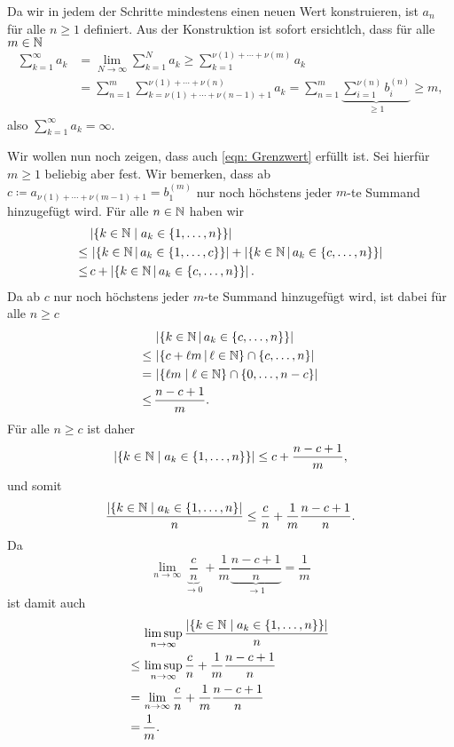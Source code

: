 \documentclass[a4paper,10pt]{article}
\begin{document}
Da wir in jedem der Schritte mindestens einen neuen Wert konstruieren, ist $a_n$ für alle $n \geq 1$ definiert. Aus der Konstruktion ist sofort ersichtlch, dass für alle $m \in \mathbb{N}$
\begin{align*}
 \sum_{k=1}^\infty a_k
 &= \lim_{N \to \infty} \sum_{k=1}^N a_k
 \geq \sum_{k=1}^{\nu(1)+\dotsb+\nu(m)} a_k \\
 &= \sum_{n=1}^m \sum_{k=\nu(1)+\dotsb+\nu(n-1)+1}^{\nu(1)+\dotsb+\nu(n)} a_k
 = \sum_{n=1}^m \underbrace{\sum_{i=1}^{\nu(n)} b^{(n)}_i}_{\geq 1}
 \geq m,
\end{align*}
also $\sum_{k=1}^\infty a_k = \infty$.

Wir wollen nun noch zeigen, dass auch \eqref{eqn: Grenzwert} erfüllt ist. Sei hierfür $m \geq 1$ beliebig aber fest. Wir bemerken, dass ab $c \coloneqq a_{\nu(1)+\dotsb+\nu(m-1)+1} = b^{(m)}_1$ nur noch höchstens jeder $m$-te Summand hinzugefügt wird. Für alle $n \in \mathbb{N}$ haben wir
\begin{align*}
     &\, |\{k \in \mathbb{N} \mid a_k \in \{1, \dotsc, n\}\}| \\
 \leq&\, \left|\left\{k \in \mathbb{N} \,\middle|\, a_k \in \left\{1, \dotsc, c\right\}\right\}\right|
         + \left|\left\{k \in \mathbb{N} \,\middle|\, a_k \in \left\{c, \dotsc, n\right\}\right\}\right| \\
  \leq&\, c + \left|\left\{k \in \mathbb{N} \,\middle|\, a_k \in \left\{c, \dotsc, n\right\}\right\}\right|.
\end{align*}
Da ab $c$ nur noch höchstens jeder $m$-te Summand hinzugefügt wird, ist dabei für alle $n \geq c$
\begin{align*}
     &\, \left|\left\{k \in \mathbb{N} \,\middle|\, a_k \in \left\{c, \dotsc, n\right\}\right\}\right| \\
 \leq&\, \left|\left\{c + \ell m \,\middle|\, \ell \in \mathbb{N}\right\} \cap \left\{c, \dotsc, n\right\}\right| \\
    =&\, \left|\{\ell m \mid \ell \in \mathbb{N}\} \cap \left\{0, \dotsc, n-c\right\}\right| \\
 \leq&\, \frac{n-c+1}{m}.
\end{align*}
Für alle $n \geq c$ ist daher
\[
 |\{k \in \mathbb{N} \mid a_k \in \{1, \dotsc, n\}\}|
 \leq c + \frac{n-c + 1}{m},
\]
und somit
\[
 \frac{|\{k \in \mathbb{N} \mid a_k \in \{1, \dotsc, n\}|}{n}
 \leq \frac{c}{n} + \frac{1}{m} \frac{n-c + 1}{n}.
\]
Da
\[
 \lim_{n \to \infty} \underbrace{\frac{c}{n}}_{\to 0} + \frac{1}{m} \underbrace{\frac{n-c + 1}{n}}_{\to 1}
 = \frac{1}{m}
\]
ist damit auch
\begin{align*}
     &\, \limsup_{n \to \infty} \frac{|\{k \in \mathbb{N} \mid a_k \in \{1, \dotsc, n\}\}|}{n} \\
 \leq&\, \limsup_{n \to \infty} \frac{c}{n} + \frac{1}{m} \frac{n-c + 1}{n} \\
    =&\, \lim_{n \to \infty} \frac{c}{n} + \frac{1}{m} \frac{n-c + 1}{n} \\
    =&\, \frac{1}{m}.
\end{align*}
\end{document}
